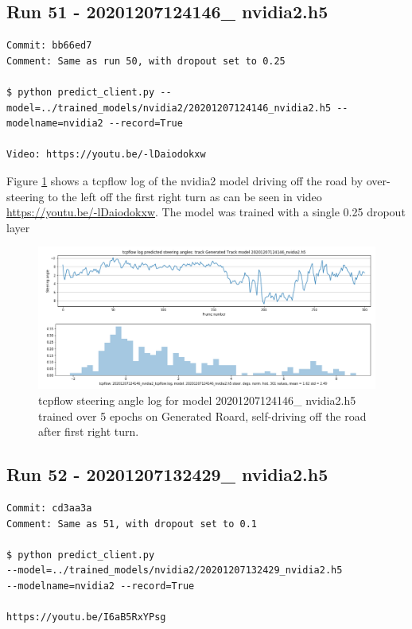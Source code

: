 \subsection{Run 51 - 20201207124146\_ nvidia2.h5 }
\begin{verbatim}
Commit: bb66ed7
Comment: Same as run 50, with dropout set to 0.25

$ python predict_client.py --model=../trained_models/nvidia2/20201207124146_nvidia2.h5 --modelname=nvidia2 --record=True

Video: https://youtu.be/-lDaiodokxw

\end{verbatim}

Figure \ref{fig:20201207124146_nvidia2_tcpflow} shows a tcpflow log of the nvidia2 model driving off the road by over-steering to the left off the first right turn as can be seen in video \url{https://youtu.be/-lDaiodokxw}. The model was trained with a single 0.25 dropout layer

\begin{figure}[ht]
 \centering 
 \includegraphics[width=\textwidth]{Figures/20201207124146_nvidia2_tcpflow.png}
 \caption{tcpflow steering angle log for model 20201207124146\_ nvidia2.h5 trained over 5 epochs on Generated Roard, self-driving off the road after first right turn.}
 \label{fig:20201207124146_nvidia2_tcpflow}
\end{figure}


\subsection{Run 52 - 20201207132429\_ nvidia2.h5}
\begin{verbatim}
Commit: cd3aa3a
Comment: Same as 51, with dropout set to 0.1

$ python predict_client.py 
--model=../trained_models/nvidia2/20201207132429_nvidia2.h5 
--modelname=nvidia2 --record=True

https://youtu.be/I6aB5RxYPsg

\end{verbatim}

